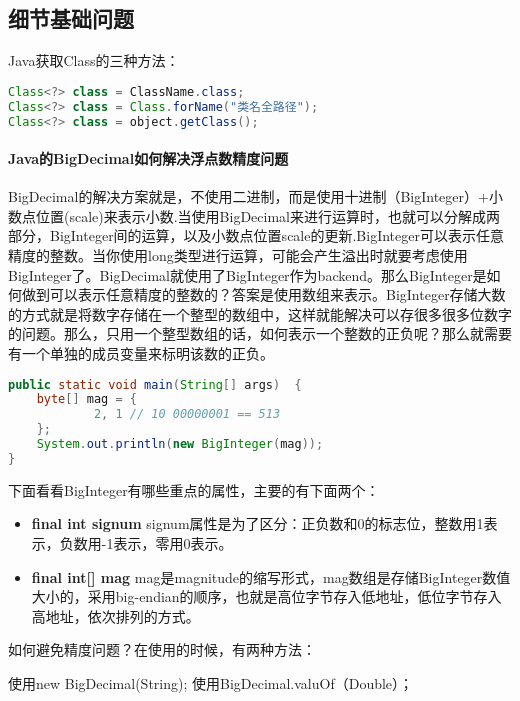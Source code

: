 \documentclass[../../../interview-questions.tex]{subfiles}
\begin{document}
\subsection{细节基础问题}

Java获取Class的三种方法：

\begin{lstlisting}[language=Java]
Class<?> class = ClassName.class;
Class<?> class = Class.forName("类名全路径");
Class<?> class = object.getClass();
\end{lstlisting}


\paragraph{Java的BigDecimal如何解决浮点数精度问题}

BigDecimal的解决方案就是，不使用二进制，而是使用十进制（BigInteger）+小数点位置(scale)来表示小数.当使用BigDecimal来进行运算时，也就可以分解成两部分，BigInteger间的运算，以及小数点位置scale的更新.BigInteger可以表示任意精度的整数。当你使用long类型进行运算，可能会产生溢出时就要考虑使用BigInteger了。BigDecimal就使用了BigInteger作为backend。那么BigInteger是如何做到可以表示任意精度的整数的？答案是使用数组来表示。BigInteger存储大数的方式就是将数字存储在一个整型的数组中，这样就能解决可以存很多很多位数字的问题。那么，只用一个整型数组的话，如何表示一个整数的正负呢？那么就需要有一个单独的成员变量来标明该数的正负。

\begin{lstlisting}[language=Java]
public static void main(String[] args)  {
    byte[] mag = {
            2, 1 // 10 00000001 == 513
    };
    System.out.println(new BigInteger(mag));
}
\end{lstlisting}

下面看看BigInteger有哪些重点的属性，主要的有下面两个：

\begin{itemize}
    \item {\bf{final int signum}} signum属性是为了区分：正负数和0的标志位，整数用1表示，负数用-1表示，零用0表示。
    \item {\bf{final int[] mag}} mag是magnitude的缩写形式，mag数组是存储BigInteger数值大小的，采用big-endian的顺序，也就是高位字节存入低地址，低位字节存入高地址，依次排列的方式。
\end{itemize}

如何避免精度问题？在使用的时候，有两种方法：

使用new BigDecimal(String);
使用BigDecimal.valuOf（Double）；
\end{document}
